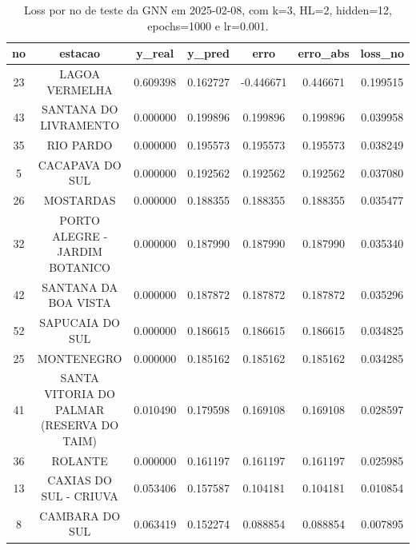 \begin{table}[h]
\centering
\caption{Loss por no de teste da GNN em 2025-02-08, com k=3, HL=2, hidden=12, epochs=1000 e lr=0.001.}
\label{tab:gnn_loss_k3_hl2_h12_e1000_d20250208}
\begin{tabular}{ccccccc}
\toprule
no & estacao & y\_real & y\_pred & erro & erro\_abs & loss\_no \\
\midrule
23 & LAGOA VERMELHA & 0.609398 & 0.162727 & -0.446671 & 0.446671 & 0.199515 \\
43 & SANTANA DO LIVRAMENTO & 0.000000 & 0.199896 & 0.199896 & 0.199896 & 0.039958 \\
35 & RIO PARDO & 0.000000 & 0.195573 & 0.195573 & 0.195573 & 0.038249 \\
5 & CACAPAVA DO SUL & 0.000000 & 0.192562 & 0.192562 & 0.192562 & 0.037080 \\
26 & MOSTARDAS & 0.000000 & 0.188355 & 0.188355 & 0.188355 & 0.035477 \\
32 & PORTO ALEGRE - JARDIM BOTANICO & 0.000000 & 0.187990 & 0.187990 & 0.187990 & 0.035340 \\
42 & SANTANA DA BOA VISTA & 0.000000 & 0.187872 & 0.187872 & 0.187872 & 0.035296 \\
52 & SAPUCAIA DO SUL & 0.000000 & 0.186615 & 0.186615 & 0.186615 & 0.034825 \\
25 & MONTENEGRO & 0.000000 & 0.185162 & 0.185162 & 0.185162 & 0.034285 \\
41 & SANTA VITORIA DO PALMAR (RESERVA DO TAIM) & 0.010490 & 0.179598 & 0.169108 & 0.169108 & 0.028597 \\
36 & ROLANTE & 0.000000 & 0.161197 & 0.161197 & 0.161197 & 0.025985 \\
13 & CAXIAS DO SUL - CRIUVA & 0.053406 & 0.157587 & 0.104181 & 0.104181 & 0.010854 \\
8 & CAMBARA DO SUL & 0.063419 & 0.152274 & 0.088854 & 0.088854 & 0.007895 \\
\bottomrule
\end{tabular}
\end{table}
